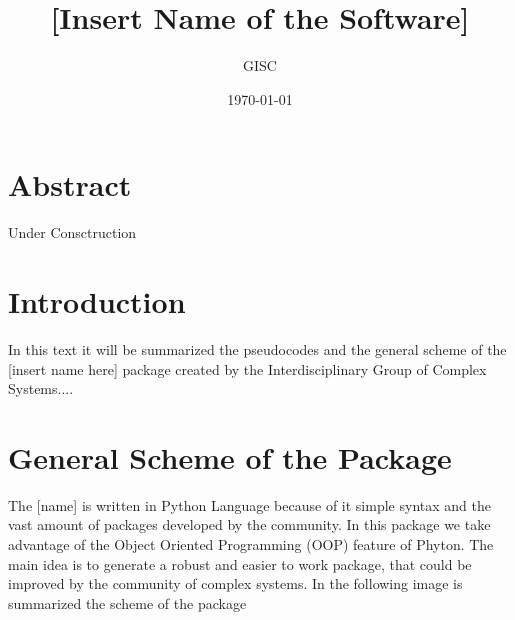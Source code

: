 \documentclass{article}
\title{[Insert Name of the Software]}
\author{GISC}
\date{\today}
\begin{document}
\maketitle

\section{Abstract}

Under Consctruction


\section{Introduction}

In this text it will be summarized the pseudocodes and the general scheme of the [insert name here] package created by the Interdisciplinary Group of Complex Systems....

\section{General Scheme of the Package}

The [name] is written in Python Language because of it simple syntax and the vast amount of packages developed by the community. In this package we take advantage of the Object Oriented Programming (OOP) feature of Phyton. The main idea is to generate a robust and easier to work package, that could be improved by the community of complex systems. In the following image is summarized the scheme of the package 
\end{document}
